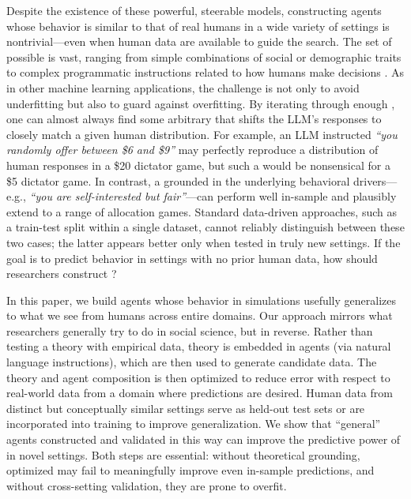 Despite the existence of these powerful, steerable models, constructing agents whose behavior is similar to that of real humans in a wide variety of settings is nontrivial---even when human data are available to guide the search.
The set of possible  is vast, ranging from simple combinations of social or demographic traits to complex programmatic instructions related to how humans make decisions \citep{zhu2025ExplPredicting,Jackson2025Mixture}.
As in other machine learning applications, the challenge is not only to avoid underfitting but also to guard against overfitting.
By iterating through enough , one can almost always find some arbitrary \persona{} that shifts the LLM's responses to closely match a given human distribution.
For example, an LLM instructed \emph{``you randomly offer between \$6 and \$9''} may perfectly reproduce a distribution of human responses in a \$20 dictator game, but such a \persona{} would be nonsensical for a \$5 dictator game.
In contrast, a \persona{} grounded in the underlying behavioral drivers---e.g., \emph{``you are self-interested but fair''}---can perform well in-sample and plausibly extend to a range of allocation games.
Standard data-driven approaches, such as a train-test split within a single dataset, cannot reliably distinguish between these two cases; the latter appears better only when tested in truly new settings.
If the goal is to predict behavior in settings with no prior human data, how should researchers construct ?

In this paper, we build agents whose behavior in simulations usefully generalizes to what we see from humans across entire domains.
Our approach mirrors what researchers generally try to do in social science, but in reverse. 
Rather than testing a theory with empirical data, theory is embedded in agents (via natural language instructions), which are then used to generate candidate data.
The theory and agent composition is then optimized to reduce error with respect to real-world data from a domain where predictions are desired.
Human data from distinct but conceptually similar settings serve as held-out test sets or are incorporated into training to improve generalization.
We show that ``general'' agents constructed and validated in this way can improve the predictive power of  in novel settings.
Both steps are essential: without theoretical grounding, optimized  may fail to meaningfully improve even in-sample predictions, and without cross-setting validation, they are prone to overfit.

